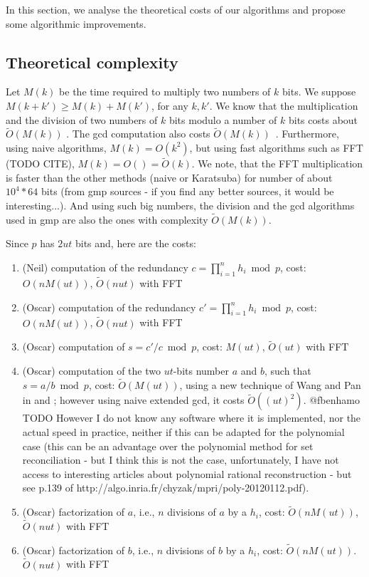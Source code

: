 \documentclass[11pt]{llncs}
\newcommand{\Oapp}{\ensuremath{\tilde{O}}}
\begin{document}
In this section, we analyse the theoretical costs of our algorithms and propose some algorithmic improvements.

\subsection{Theoretical complexity}

Let $M(k)$ be the time required to multiply two numbers of $k$ bits.
We suppose $M(k+k') \ge M(k) + M(k')$, for any $k,k'$.
We know that the multiplication and the division of two numbers of $k$ bits modulo a number of $k$ bits costs about $\Oapp(M(k))$ \cite{burnikel1998fast}.
The gcd computation also costs $\Oapp(M(k))$~\cite{moller2008schonhage}.
Furthermore, using naive algorithms, $M(k) = O(k^2)$, but using fast algorithms such as FFT (TODO CITE), $M(k) = O( ) = \Oapp(k)$.
We note, that the FFT multiplication is faster than the other methods (naive or Karatsuba) for number of about $10^4*64$ bits (from gmp sources - if you find any better sources, it would be interesting...).
And using such big numbers, the division and the gcd algorithms used in gmp are also the ones with complexity $\Oapp(M(k))$.

Since $p$ has $2 u t$ bits and, here are the costs:
\begin{enumerate}
\item (Neil) computation of the redundancy $c=\prod_{i=1}^n h_i \bmod p$, cost: $O(n M(u t))$, $\Oapp(n u t)$ with FFT
\item (Oscar) computation of the redundancy $c'=\prod_{i=1}^n h_i \bmod p$, cost: $O(n M(u t))$, $\Oapp(n u t)$ with FFT
\item (Oscar) computation of $s = c' / c \bmod p$, cost: $M(u t)$, $\Oapp(u t)$ with FFT
\item (Oscar) computation of the two $u t$-bits number $a$ and $b$, such that $s = a / b \bmod p$, cost: $\Oapp(M(u t))$, using a new technique of Wang and Pan in \cite{pan2004rational} and \cite{wang2003acceleration}; however using naive extended gcd, it costs $\Oapp((u t)^2)$.
@fbenhamo TODO However I do not know any software where it is implemented, nor the actual speed in practice, neither if this can be adapted for the polynomial case (this can be an advantage over the polynomial method for set reconciliation - but I think this is not the case, unfortunately, I have not access to interesting articles about polynomial rational reconstruction - but see p.139 of http://algo.inria.fr/chyzak/mpri/poly-20120112.pdf).
\item (Oscar) factorization of $a$, i.e., $n$ divisions of $a$ by a $h_i$, cost: $\Oapp(n M(u t))$, $\Oapp(n u t)$ with FFT
\item (Oscar) factorization of $b$, i.e., $n$ divisions of $b$ by a $h_i$, cost: $\Oapp(n M(u t))$. $\Oapp(n u t)$ with FFT
\end{enumerate}
\end{document}
